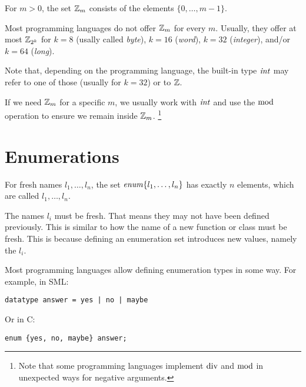 For $m>0$, the set $\mathbb{Z}_m$ consists of the elements $\{0,\ldots,m-1\}$.

Most programming languages do not offer $\mathbb{Z}_m$ for every $m$.
Usually, they offer at most $\mathbb{Z}_{2^k}$ for $k=8$ (usally called \emph{byte}), $k=16$ (\emph{word}), $k=32$ (\emph{integer}), and/or $k=64$ (\emph{long}).

Note that, depending on the programming language, the built-in type $\mathit{int}$ may refer to one of those (usually for $k=32$) or to $\mathbb{Z}$.

If we need $\mathbb{Z}_m$ for a specific $m$, we usually work with $\mathit{int}$ and use the $\mathop{\mathrm{mod}}$ operation to ensure we remain inside $\mathbb{Z}_m$.
\footnote{Note that some programming languages implement $\mathop{\mathrm{div}}$ and $\mathop{\mathrm{mod}}$ in unexpected ways for negative arguments.}

\section{Enumerations}

For fresh names $l_1,\ldots,l_n$, the set $\mathit{enum}\{l_1,\ldots,l_n\}$ has exactly $n$ elements, which are called $l_1,\ldots,l_n$.

The names $l_i$ must be fresh.
That means they may not have been defined previously.
This is similar to how the name of a new function or class must be fresh.
This is because defining an enumeration set introduces new values, namely the $l_i$.

Most programming languages allow defining enumeration types in some way.
For example, in SML:

\begin{lstlisting}
datatype answer = yes | no | maybe
\end{lstlisting}

Or in C:

\begin{lstlisting}
enum {yes, no, maybe} answer;
\end{lstlisting}